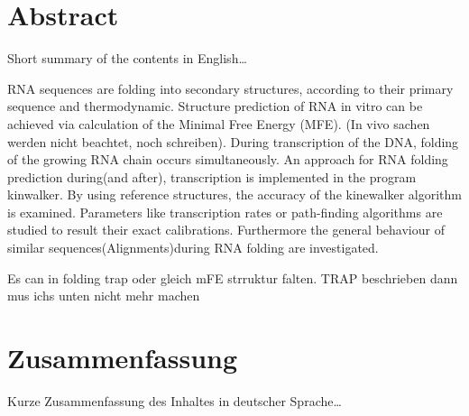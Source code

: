 \begingroup
\let\clearpage\relax
\let\cleardoublepage\relax
\let\cleardoublepage\relax

\chapter*{Abstract}
Short summary of the contents in English\dots

RNA sequences are folding into secondary structures, according to their primary sequence and thermodynamic. Structure prediction of RNA in vitro can be achieved via calculation of the Minimal Free Energy (MFE). (In vivo sachen werden nicht beachtet, noch schreiben). During transcription of the DNA, folding of the growing RNA chain occurs simultaneously. An approach for RNA folding prediction during(and after), transcription is implemented in the program kinwalker. By using reference structures, the accuracy of the kinewalker algorithm is examined. Parameters like transcription rates or path-finding algorithms are studied to result their exact calibrations. 
Furthermore the general behaviour of similar sequences(Alignments)during RNA folding are investigated.

Es can in folding trap oder gleich mFE strruktur falten. TRAP beschrieben dann mus ichs unten nicht mehr machen




\vfill

\chapter*{Zusammenfassung}
Kurze Zusammenfassung des Inhaltes in deutscher Sprache\dots

